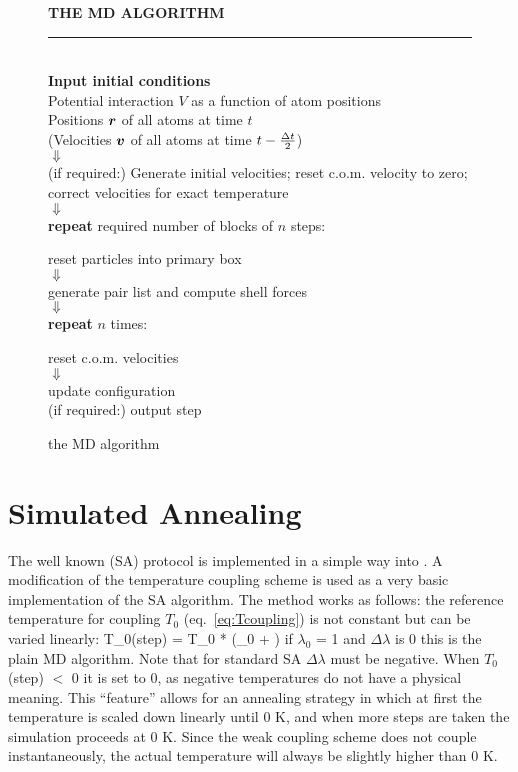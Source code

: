 \begin{figure}
\begin{center}
\addtolength{\fboxsep}{0.5cm}
\begin{shadowenv}[12cm]
{\large \bf THE MD ALGORITHM}
\rule{\textwidth}{2pt} \\
{\bf Input initial conditions} \\[2ex]
Potential interaction $V$ as a function of atom positions \\
Positions $\mbox{\boldmath ${r}$}$ of all atoms at time $t$ \\
(Velocities $\mbox{\boldmath ${v}$}$ of all atoms at time $t-{\frac {\Delta t}{2}}$) \\
$\Downarrow$ \\
(if required:) Generate initial velocities; reset c.o.m. velocity to
zero; correct velocities for exact temperature \\
$\Downarrow$ \\
{\bf repeat} required number of blocks of $n$ steps:
\begin{shadowenv}[10cm]
reset particles into primary box \\
$\Downarrow$ \\
generate pair list and compute shell forces\\
$\Downarrow$ \\
{\bf repeat} $n$ times:
\begin{shadowenv}[8cm]
reset c.o.m. velocities \\
$\Downarrow$ \\
update configuration \\
(if required:) output step
\end{shadowenv}
\end{shadowenv}
\end{shadowenv}
\caption{the MD algorithm}
\label{fig:flowdetail}
\end{center}  
\end{figure}

\section{Simulated Annealing}
\label{sec:SA}
The well known 
(SA) protocol is implemented
in a simple way into {\gromacs}. A modification of the temperature coupling
scheme is used as a very basic implementation of the SA algorithm. The
method works as follows: the reference temperature for coupling $T_0$
(eq.~\ref{eq:Tcoupling})
is not constant but can be varied linearly:
\beq
T_0({\rm step}) = T_0 * (\lambda_0 + \Delta{})
\label{eq:SA}
\eeq
if $\lambda_0$ = 1 and $\Delta\lambda$ is 0 this is the plain MD
algorithm. Note that for standard SA $\Delta\lambda$  must be negative.
When $T_0$(step) $<$ 0 it is set to 0, as negative temperatures do not have
a physical meaning. This ``feature'' 
allows for an annealing strategy in which
at first the temperature is scaled down linearly until 0 K, 
and when more steps
are taken the simulation proceeds at 0 K. Since the weak coupling scheme
does not couple instantaneously, the actual temperature will
always be slightly higher than 0 K.

